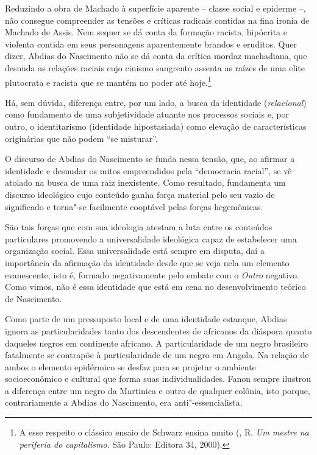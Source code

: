 Reduzindo a obra de Machado à superfície aparente -- classe social e
epiderme --, não consegue compreender as tensões e críticas radicais
contidas na fina ironia de Machado de Assis. Nem sequer se dá conta da
formação racista, hipócrita e violenta contida em seus personagens
aparentemente brandos e eruditos. Quer dizer, Abdias do Nascimento não
se dá conta da crítica mordaz machadiana, que desnuda as relações
raciais cujo cinismo sangrento assenta as raízes de uma elite plutocrata
e racista que se mantém no poder até hoje.\footnote{A esse respeito o
  clássico ensaio de Schwarz ensina muito (, R. \emph{Um mestre
  na periferia do capitalismo}. São Paulo: Editora 34, 2000).}

Há, sem dúvida, diferença entre, por um lado, a busca da identidade
(\emph{relacional}) como fundamento de uma subjetividade atuante nos
processos sociais e, por outro, o identitarismo (identidade
hipostasiada) como elevação de características originárias que não podem
``se misturar''.

O discurso de Abdias do Nascimento se funda nessa tensão, que, ao
afirmar a identidade e desnudar os mitos empreendidos pela ``democracia
racial'', se vê atolado na busca de uma raiz inexistente. Como resultado,
fundamenta um discurso ideológico cujo conteúdo ganha força material
pelo seu vazio de significado e torna"-se facilmente cooptável pelas
forças hegemônicas.

São tais forças que com sua
ideologia atestam a luta entre os conteúdos particulares promovendo a
universalidade ideológica capaz de estabelecer uma organização social.
Essa universalidade está sempre em disputa, daí a importância da
afirmação da identidade desde que se veja nela um elemento evanescente,
isto é, formado negativamente pelo embate com o \emph{Outro} negativo.
Como vimos, não é essa identidade que está em cena no desenvolvimento
teórico de Nascimento.

Como parte de um pressuposto local e de uma identidade estanque, Abdias
ignora as particularidades tanto dos descendentes de africanos da
diáspora quanto daqueles negros em continente africano. A
particularidade de um negro brasileiro fatalmente se contrapõe à
particularidade de um negro em Angola. Na relação de ambos o elemento
epidérmico se desfaz para se projetar o ambiente socioeconômico e
cultural que forma suas individualidades. Fanon sempre ilustrou a
diferença entre um negro da Martinica e outro de qualquer colônia, isto
porque, contrariamente a Abdias do Nascimento, era anti"-essencialista.

